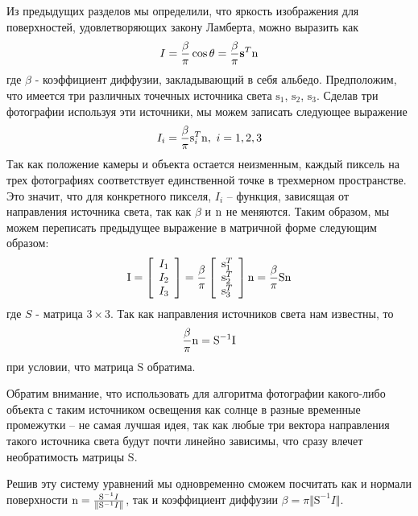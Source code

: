 Из предыдущих разделов мы определили, что яркость изображения для поверхностей,
удовлетворяющих закону Ламберта, можно выразить как
\[I=\frac{\beta}{\pi}\cos\theta=\frac{\beta}{\pi}\mathbf{s}^T\mathrm{n}\]
где $\beta$ - коэффициент диффузии, закладывающий в себя альбедо. Предположим, что
имеется три различных точечных источника света $\mathrm{s}_1$, $\mathrm{s}_2$, $\mathrm{s}_3$.
Сделав три фотографии используя эти источники, мы можем записать следующее выражение
\[I_i=\frac{\beta}{\pi}\mathrm{s}^T_i\norm,\ i=1,2,3\]
Так как положение камеры и объекта остается неизменным, каждый пиксель на трех фотографиях
соответствует единственной точке в трехмерном пространстве. Это значит, что для конкретного
пикселя, $I_i$ -- функция, зависящая от направления источника света, так как $\beta$ и $\mathrm{n}$
не меняются. Таким образом, мы можем переписать предыдущее выражение в матричной форме
следующим образом:
\[\mathrm{I}=\left[\begin{array}{c}
      I_1 \\ I_2 \\ I_3
    \end{array}\right] = \frac{\beta}{\pi}\left[\begin{array}{c}
      \mathrm{s}^T_1 \\ \mathrm{s}^T_2 \\ \mathrm{s}^T_3
    \end{array}\right]\mathrm{n} = \frac{\beta}{\pi}\mathrm{S}\mathrm{n}\]
где $S$ - матрица $3\times3$. Так как направления источников света нам известны, то
\[\frac{\beta}{\pi}\mathrm{n}=\mathrm{S}^{-1}\mathrm{I}\]
при условии, что матрица $\mathrm{S}$ обратима.
\begin{remark}
  Обратим внимание, что использовать для алгоритма фотографии какого-либо объекта
  с таким источником освещения как солнце в разные временные промежутки -- не самая лучшая
  идея, так как любые три вектора направления такого источника света будут почти линейно
  зависимы, что сразу влечет необратимость матрицы $\mathrm{S}$.
\end{remark}
Решив эту систему уравнений мы одновременно сможем посчитать как и нормали поверхности
$\mathrm{n}=\frac{\mathrm{S}^{-1}I}{\Vert\mathrm{S}^{-1}I\Vert}$, так и
коэффициент диффузии $\beta=\pi\Vert\mathrm{S}^{-1}I\Vert$.


